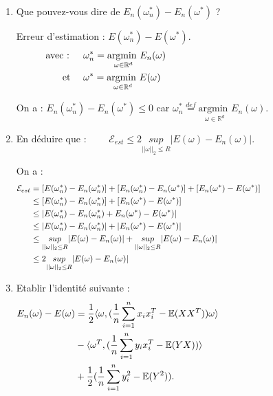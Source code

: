 \documentclass[12pt,a4paper]{article}
\begin{document}
\begin{enumerate}
    \color{black}
    \item Que pouvez-vous dire de $E_n(\omega_n^*) - E_n(\omega^*)$ ?
    
    \color{blue}
    Erreur d'estimation : $E(\omega_n^*) - E(\omega^*)$.
    \begin{align*}
        \text{avec : } \quad &\omega_n^* = \underset{\omega \in \mathbb{R}^d}{\text{argmin }} E_n(\omega) \hspace{14.5cm}\\
        \text{ et } \quad &\omega^* = \underset{\omega \in \mathbb{R}^d}{\text{argmin }} E(\omega)
    \end{align*}

    On a : $E_n(\omega_n^*) - E_n(\omega^*) \leq 0$ car $\omega_n^* \overset{def}{=} \underset{\omega \in \mathbb{R}^d}{\text{argmin }} E_n(\omega)$.\\
    

    \color{black}
    \item En déduire que : $\quad \quad \mathcal{E}_{est} \leq 2 \underset{||\omega||_2 \leq R}{ sup } |E(\omega) - E_n(\omega)|.$
    
    \color{blue}
    On a :
    \begin{align*}
        \mathcal{E}_{est} &= [ E(\omega_n^*) - E_n(\omega_n^*)] + [ E_n(\omega_n^*) - E_n(\omega^*)] + [ E_n(\omega^*) - E(\omega^*)] \hspace{14.5cm}\\
        &\leq [ E(\omega_n^*) - E_n(\omega_n^*)] + [ E_n(\omega^*) - E(\omega^*)] \\
        &\leq |E(\omega_n^*) - E_n(\omega_n^*) + E_n(\omega^*) - E(\omega^*)| \\
        &\leq |E(\omega_n^*) - E_n(\omega_n^*)| + |E_n(\omega^*) - E(\omega^*)| \\
        &\leq \underset{||\omega||_2 \leq R}{ sup } |E(\omega) - E_n(\omega)| + \underset{||\omega||_2 \leq R}{ sup } |E(\omega) - E_n(\omega)| \\
        &\leq 2 \underset{||\omega||_2 \leq R}{ sup } |E(\omega) - E_n(\omega)|
    \end{align*}

    \color{black}
    \item Etablir l’identité suivante :
    \begin{align*}
        E_n(\omega) - E(\omega) &= \frac{1}{2} \langle \omega, (\frac{1}{n} \sum_{i = 1}^{n} x_i x_i^T - \mathbb{E}(XX^T))\omega \rangle \hspace{14.5cm} \\
        &- \langle \omega^T, (\frac{1}{n} \sum_{i = 1}^{n} y_i x_i^T - \mathbb{E}(YX)) \rangle\\
        &+ \frac{1}{2} (\frac{1}{n} \sum_{i = 1}^{n} y_i^2 - \mathbb{E}(Y^2)).
    \end{align*}


\end{enumerate}
\end{document}

